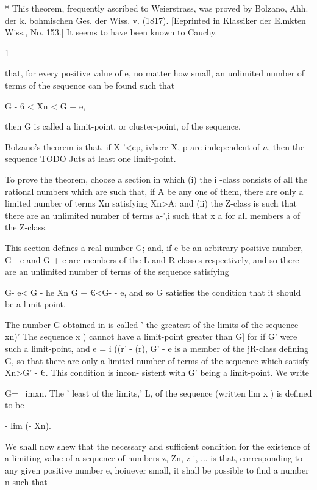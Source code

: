 * This theorem, frequently ascribed to Weierstrass, was proved by
Bolzano, Ahh. der k. bohmischen Ges. der Wiss. v. (1817). [Eeprinted
in Klassiker der E.mkten Wiss., No. 153.] It seems to have been known
to Cauchy.

1-

%
%

that, for every positive value of e, no matter how small, an unlimited
number of terms of the sequence can be found such that

G - 6 < Xn < G + e,

then G is called a limit-point, or cluster-point, of the sequence.

Bolzano's theorem is that, if X '<cp, ivhere X, p are independent of
$n$, then the sequence TODO Juts at least one limit-point.

To prove the theorem, choose a section in which (i) the i -class
consists of all the rational numbers which are such that, if A be any
one of them, there are only a limited number of terms Xn satisfying
Xn>A; and (ii) the Z-class is such that there are an unlimited number
of terms a-',i such that x a for all members a of the Z-class.

This section defines a real number G; and, if e be an arbitrary
positive number, G - e and G + e are members of the L and R classes
respectively, and so there are an unlimited number of terms of the
sequence satisfying

G- e< G - he Xn G + €<G- - e, and so G satisfies the condition that it
should be a limit-point.


The number G obtained in is called ' the greatest of the limits
of the sequence xn)' The sequence x ) cannot have a limit-point
greater than G] for if G' were such a limit-point, and e = i ((r' -
(r), G' - e is a member of the jR-class defining G, so that there are
only a limited number of terms of the sequence which satisfy Xn>G' -
€. This condition is incon- sistent with G' being a limit-point. We
write

G= \ imxn. The ' least of the limits,' L, of the sequence (written lim
x ) is defined to be

- lim (- Xn).


We shall now shew that the necessary and sufficient condition for the
existence of a limiting value of a sequence of numbers z, Zn, z-i,
... is that, corresponding to any given positive number e, hoiuever
small, it shall be possible to find a number n such that

